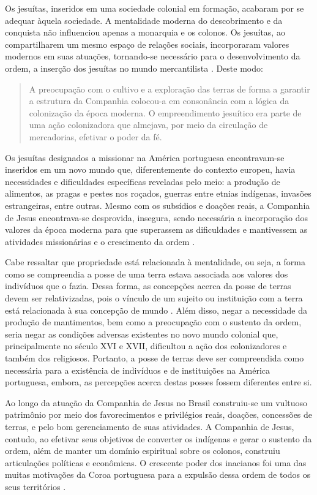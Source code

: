 Os jesuítas, inseridos em uma sociedade colonial em formação, acabaram por se adequar àquela sociedade. A mentalidade moderna do descobrimento e da conquista não influenciou apenas a monarquia e os colonos. Os jesuítas, ao compartilharem um mesmo espaço de relações sociais, incorporaram valores modernos em suas atuações, tornando-se necessário para o desenvolvimento da ordem, a inserção dos jesuítas no mundo mercantilista \cite[p.~239]{Assuncao2004}. Deste modo:

    \begin{quote}
    A preocupação com o cultivo e a exploração das terras de forma a garantir a estrutura da Companhia colocou-a em consonância com a lógica da colonização da época moderna. O empreendimento jesuítico era parte de uma ação colonizadora que almejava, por meio da circulação de mercadorias, efetivar o poder da fé. \cite[p.~251]{Assuncao2004}         
    \end{quote}

Os jesuítas designados a missionar na América portuguesa encontravam-se inseridos em um novo mundo que, diferentemente do contexto europeu, havia necessidades e dificuldades específicas reveladas pelo meio: a produção de alimentos, as pragas e pestes nos roçados, guerras entre etnias indígenas, invasões estrangeiras, entre outras. Mesmo com os subsídios e doações reais, a Companhia de Jesus encontrava-se desprovida, insegura, sendo necessária a incorporação dos valores da época moderna para que superassem as dificuldades e mantivessem as atividades missionárias e o crescimento da ordem \cite[p.~151]{Assuncao2004}. 

Cabe ressaltar que propriedade está relacionada à mentalidade, ou seja, a forma como se compreendia a posse de uma terra estava associada aos valores dos indivíduos que o fazia. Dessa forma, as concepções acerca da posse de terras devem ser relativizadas, pois o vínculo de um sujeito ou instituição com a terra está relacionada à sua concepção de mundo \cite[p.~30--31]{Grossi2006}. Além disso, negar a necessidade da produção de mantimentos, bem como a preocupação com o sustento da ordem, seria negar as condições adversas existentes no novo mundo colonial que, principalmente no século XVI e XVII, dificultou a ação dos colonizadores e também dos religiosos. Portanto, a posse de terras deve ser compreendida como necessária para a existência de indivíduos e de instituições na América portuguesa, embora, as percepções acerca destas posses fossem diferentes entre si.  

Ao longo da atuação da Companhia de Jesus no Brasil construiu-se um vultuoso patrimônio por meio dos favorecimentos e privilégios reais, doações, concessões de terras, e pelo bom gerenciamento de suas atividades. A Companhia de Jesus, contudo, ao efetivar seus objetivos de converter os indígenas e gerar o sustento da ordem, além de manter um domínio espiritual sobre os colonos, construiu articulações políticas e econômicas. O crescente poder dos inacianos foi uma das muitas motivações da Coroa portuguesa para a expulsão dessa ordem de todos os seus territórios \cite{Couto1990}.




